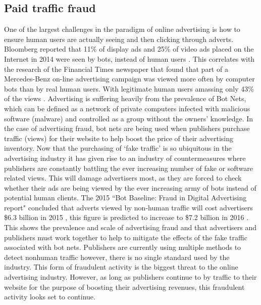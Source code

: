 \documentclass[12pt]{article}
\begin{document}
\subsection{Paid traffic fraud}
One of the largest challenges in the paradigm of online advertising is how to ensure human users are actually seeing and then clicking through adverts. Bloomberg reported that 11\% of display ads and 25\% of video ads placed on the Internet in 2014 were seen by bots, instead of human users \parencite{bloomFraud}. This correlates with the research of the Financial Times newspaper that found that part of a Mercedes-Benz on-line advertising campaign was viewed more often by computer bots than by real human users. With legitimate human users amassing only 43\% of the views \parencite{mercFraud}. Advertising is suffering heavily from the prevalence of Bot Nets, which can be defined as a network of private computers infected with malicious software (malware)  and controlled as a group without the owners' knowledge. In the case of advertising fraud, bot nets are being used when publishers purchase traffic (views) for their website to help boost the price of their advertising inventory. Now that the purchasing of `fake traffic' is so ubiquitous in the advertising industry it has given rise to an industry of countermeasures \parencite{bloomFraud} where publishers are constantly battling the ever increasing number of fake or software related views. This will damage advertisers most, as they are forced to check whether their ads are being viewed by the ever increasing army of bots instead of potential human clients. The 2015 ``Bot Baseline: Fraud in Digital Advertising report" concluded that adverts viewed by non-human traffic will cost advertisers \$6.3 billion in 2015 \parencite{botfraud2015}, this figure is predicted to increase to \$7.2 billion in 2016 \parencite{botfraud2016}. This shows the prevalence and scale of advertising fraud and that advertisers and publishers must work together to help to mitigate the effects of the fake traffic associated with bot nets. Publishers are currently using multiple methods to detect nonhuman traffic however, there is no single standard used by the industry. This form of fraudulent activity is the biggest threat to the online advertising industry. However, as long as publishers continue to by traffic to their website for the purpose of boosting their advertising revenues, this fraudulent activity looks set to continue.

\end{document}
